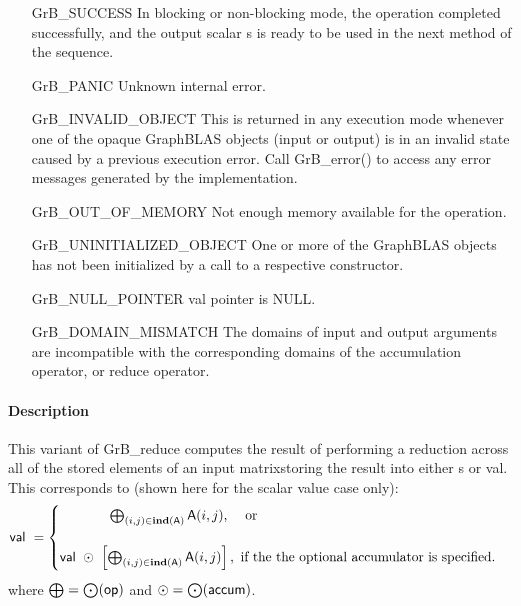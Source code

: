 \begin{itemize}[leftmargin=2.1in]
    \item[{\sf GrB\_SUCCESS}]         In blocking or non-blocking mode, 
    the operation completed successfully, and the
    output scalar {\sf s} is ready to be used in the next method of 
    the sequence.

    \item[{\sf GrB\_PANIC}]           Unknown internal error.

    \item[{\sf GrB\_INVALID\_OBJECT}] This is returned in any execution mode 
    whenever one of the opaque GraphBLAS objects (input or output) is in an invalid 
    state caused by a previous execution error.  Call {\sf GrB\_error()} to access 
    any error messages generated by the implementation.

    \item[{\sf GrB\_OUT\_OF\_MEMORY}] Not enough memory available for the operation.

    \item[{\sf GrB\_UNINITIALIZED\_OBJECT}] One or more of the GraphBLAS objects 
    has not been initialized by a call to a respective constructor.

    \item[{\sf GrB\_NULL\_POINTER}]  {\sf val} pointer is {\sf NULL}.

    \item[{\sf GrB\_DOMAIN\_MISMATCH}]    The domains of input and output arguments are
    incompatible with the corresponding domains of the accumulation operator, 
    or reduce operator.
\end{itemize}

\paragraph{Description}

This variant of {\sf GrB\_reduce} computes the result of performing
a reduction across all of the stored elements of an input matrixstoring the result into either
{\sf s} or {\sf val}.  This corresponds to (shown here for the scalar value case only):
\begin{equation*}
{\sf val} ~ = 
  \begin{cases}
     \hspace{3.7em} \bigoplus_{(i, j) \in \mathbf{ind}({\sf A})} {\sf A}(i, j) \text{,~~~ or} \\& \\
    {\sf val} ~\odot~ \left[ \bigoplus_{(i, j) \in \mathbf{ind}({\sf A})} {\sf A}(i, j)\right], \text{~if the the optional accumulator is specified.} 
  \end{cases}
\end{equation*}
where $\bigoplus = \bigodot({\sf op})$ and $\odot = \bigodot({\sf accum})$.  

